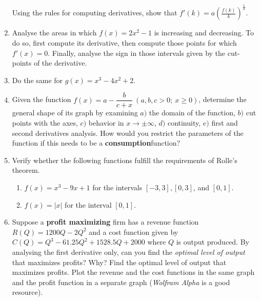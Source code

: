\documentclass[a4paper,11pt]{article}
\theoremstyle{definition}
\theoremstyle{plain}
\begin{document}
\begin{enumerate}
Using the rules for computing derivatives, show that
\(f'(k) = a\left(\frac{f(k)}{k}\right)^{\frac{1}{\sigma}}\).

\item Analyse the areas in which \(f(x) = 2x^2 - 1\) is
increasing and decreasing. To do so, first compute its derivative, then
compute those points for which \(f'(x) = 0\). Finally, analyse the sign
in those intervals given by the cut-points of the derivative.

\item Do the same for \(g(x) = x^3-4x^2+2\).

\item Given the function \(\displaystyle f(x) = a - \dfrac{b}{c + x} \: (a,b,c > 0; \: x \geq 0)\), determine the general shape of its graph by examining \(a)\) the domain of the function, \(b)\) cut points with the axes, \(c)\) behavior in \(x\rightarrow \pm \infty\), \(d)\) continuity, \(e)\) first and second derivatives analysis. How would you restrict the parameters of the function if this needs to be a \textbf{consumption}function?

\item Verify whether the following functions fulfill the requirements of Rolle's theorem.

    \begin{enumerate}[label = (\alph*)]
        \item \(f(x) = x^3 - 9x + 1\) for the intervals \([-3,3],[0, 3]\), and \([0, 1]\).
        \item \(f(x) = \lvert x \rvert\) for the interval \([0, 1]\).
    \end{enumerate}

\item Suppose a \textbf{profit maximizing} firm has a revenue function \(R(Q) = 1200 Q - 2Q^2\) and a cost function given by \(C(Q) = Q^3 - 61.25Q^2 + 1528.5Q + 2000\) where \(Q\) is output produced. By analysing the first derivative only, can you find the \emph{optimal level of output} that maximizes profits? Why? Find the optimal level of output that maximizes profits. Plot the revenue and the cost functions in the same graph and the profit function in a separate graph (\emph{Wolfram Alpha} is a good resource).
\end{enumerate}
\end{document}
